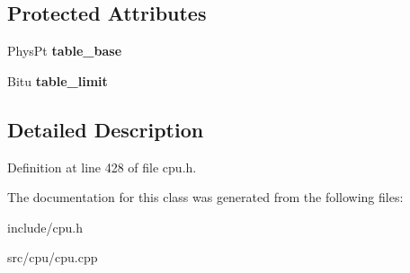 \subsection*{Protected Attributes}
\begin{DoxyCompactItemize}
\item 
\hypertarget{classDescriptorTable_a98077958af230be31af60525318ee702}{Phys\-Pt {\bfseries table\-\_\-base}}\label{classDescriptorTable_a98077958af230be31af60525318ee702}

\item 
\hypertarget{classDescriptorTable_aee4c9d381d9092de9af52396044bbd72}{Bitu {\bfseries table\-\_\-limit}}\label{classDescriptorTable_aee4c9d381d9092de9af52396044bbd72}

\end{DoxyCompactItemize}


\subsection{Detailed Description}


Definition at line 428 of file cpu.\-h.



The documentation for this class was generated from the following files\-:\begin{DoxyCompactItemize}
\item 
include/cpu.\-h\item 
src/cpu/cpu.\-cpp\end{DoxyCompactItemize}
